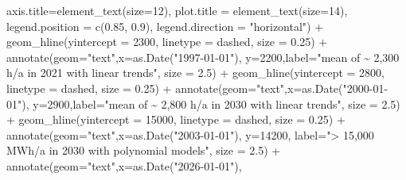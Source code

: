 \documentclass[a4paper,11pt]{article}
\newenvironment{Shaded}{\begin{snugshade}}{\end{snugshade}}
\newcommand{\AttributeTok}[1]{\textcolor[rgb]{0.77,0.63,0.00}{#1}}
\newcommand{\DecValTok}[1]{\textcolor[rgb]{0.00,0.00,0.81}{#1}}
\newcommand{\FloatTok}[1]{\textcolor[rgb]{0.00,0.00,0.81}{#1}}
\newcommand{\FunctionTok}[1]{\textcolor[rgb]{0.00,0.00,0.00}{#1}}
\newcommand{\NormalTok}[1]{#1}
\newcommand{\SpecialCharTok}[1]{\textcolor[rgb]{0.00,0.00,0.00}{#1}}
\newcommand{\StringTok}[1]{\textcolor[rgb]{0.31,0.60,0.02}{#1}}
\begin{document}
\begin{Shaded}
\begin{Highlighting}[]
         \AttributeTok{axis.title=}\FunctionTok{element\_text}\NormalTok{(}\AttributeTok{size=}\DecValTok{12}\NormalTok{),}
         \AttributeTok{plot.title =} \FunctionTok{element\_text}\NormalTok{(}\AttributeTok{size=}\DecValTok{14}\NormalTok{),}
         \AttributeTok{legend.position =} \FunctionTok{c}\NormalTok{(}\FloatTok{0.85}\NormalTok{, }\FloatTok{0.9}\NormalTok{),}
         \AttributeTok{legend.direction =} \StringTok{"horizontal"}\NormalTok{) }\SpecialCharTok{+}
  \FunctionTok{geom\_hline}\NormalTok{(}\AttributeTok{yintercept =} \DecValTok{2300}\NormalTok{, }\AttributeTok{linetype =} \StringTok{\textquotesingle{}dashed\textquotesingle{}}\NormalTok{, }\AttributeTok{size =} \FloatTok{0.25}\NormalTok{) }\SpecialCharTok{+}
  \FunctionTok{annotate}\NormalTok{(}\AttributeTok{geom=}\StringTok{"text"}\NormalTok{,}\AttributeTok{x=}\FunctionTok{as.Date}\NormalTok{(}\StringTok{"1997{-}01{-}01"}\NormalTok{),}
           \AttributeTok{y=}\DecValTok{2200}\NormalTok{,}\AttributeTok{label=}\StringTok{"mean of \textasciitilde{} 2,300 h/a in 2021 with linear trends"}\NormalTok{,}
           \AttributeTok{size =} \FloatTok{2.5}\NormalTok{) }\SpecialCharTok{+}
  \FunctionTok{geom\_hline}\NormalTok{(}\AttributeTok{yintercept =} \DecValTok{2800}\NormalTok{, }\AttributeTok{linetype =} \StringTok{\textquotesingle{}dashed\textquotesingle{}}\NormalTok{, }\AttributeTok{size =} \FloatTok{0.25}\NormalTok{) }\SpecialCharTok{+}
  \FunctionTok{annotate}\NormalTok{(}\AttributeTok{geom=}\StringTok{"text"}\NormalTok{,}\AttributeTok{x=}\FunctionTok{as.Date}\NormalTok{(}\StringTok{"2000{-}01{-}01"}\NormalTok{),}
           \AttributeTok{y=}\DecValTok{2900}\NormalTok{,}\AttributeTok{label=}\StringTok{"mean of \textasciitilde{} 2,800 h/a in 2030 with linear trends"}\NormalTok{,}
           \AttributeTok{size =} \FloatTok{2.5}\NormalTok{) }\SpecialCharTok{+}
  \FunctionTok{geom\_hline}\NormalTok{(}\AttributeTok{yintercept =} \DecValTok{15000}\NormalTok{, }\AttributeTok{linetype =} \StringTok{\textquotesingle{}dashed\textquotesingle{}}\NormalTok{, }\AttributeTok{size =} \FloatTok{0.25}\NormalTok{) }\SpecialCharTok{+}
  \FunctionTok{annotate}\NormalTok{(}\AttributeTok{geom=}\StringTok{"text"}\NormalTok{,}\AttributeTok{x=}\FunctionTok{as.Date}\NormalTok{(}\StringTok{"2003{-}01{-}01"}\NormalTok{),}
           \AttributeTok{y=}\DecValTok{14200}\NormalTok{, }\AttributeTok{label=}\StringTok{"\textgreater{} 15,000 MWh/a in 2030 with polynomial models"}\NormalTok{, }
           \AttributeTok{size =} \FloatTok{2.5}\NormalTok{) }\SpecialCharTok{+}
  \FunctionTok{annotate}\NormalTok{(}\AttributeTok{geom=}\StringTok{"text"}\NormalTok{,}\AttributeTok{x=}\FunctionTok{as.Date}\NormalTok{(}\StringTok{"2026{-}01{-}01"}\NormalTok{),}

\end{Highlighting}
\end{Shaded}
\end{document}
